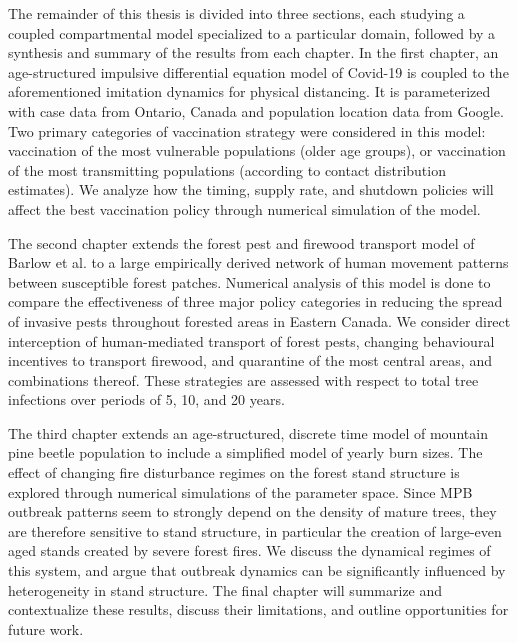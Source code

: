 The remainder of this thesis is divided into three sections, each studying a coupled compartmental model specialized to a particular domain, followed by a synthesis and summary of the results from each chapter. In the first chapter, an age-structured impulsive differential equation model of Covid-19 is coupled to the aforementioned imitation dynamics for physical distancing. It is parameterized with case data from Ontario, Canada and population location data from Google. Two primary categories of vaccination strategy were considered in this model: vaccination of the most vulnerable populations (older age groups), or vaccination of the most transmitting populations (according to contact distribution estimates). We analyze how the timing, supply rate, and shutdown policies will affect the best vaccination policy through numerical simulation of the model.

The second chapter extends the forest pest and firewood transport model of Barlow et al. \cite{barlow2014modelling} to a large empirically derived network of human movement patterns between susceptible forest patches. Numerical analysis of this model is done to compare the effectiveness of three major policy categories in reducing the spread of invasive pests throughout forested areas in Eastern Canada. We consider direct interception of human-mediated transport of forest pests, changing behavioural incentives to transport firewood, and quarantine of the most central areas, and combinations thereof. These strategies are assessed with respect to total tree infections over periods of 5, 10, and 20 years.

The third chapter extends an age-structured, discrete time model of mountain pine beetle population \cite{duncan2015model} to include a simplified model of yearly burn sizes. The effect of changing fire disturbance regimes on the forest stand structure is explored through numerical simulations of the parameter space. Since MPB outbreak patterns seem to strongly depend on the density of mature trees, they are therefore sensitive to stand structure, in particular the creation of large-even aged stands created by severe forest fires. We discuss the dynamical regimes of this system, and argue that outbreak dynamics can be significantly influenced by heterogeneity in stand structure. The final chapter will summarize and contextualize these results, discuss their limitations, and outline opportunities for future work.